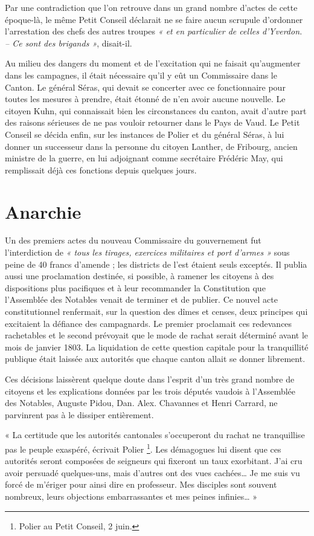 \documentclass[french,twoside]{book} %
\newenvironment{quoteblock}%
  {\begin{quoting}}
  {\end{quoting}}
\newenvironment{quotebar}{%
    \def\FrameCommand{{\color{rubric!10!}\vrule width 0.5em} \hspace{0.9em}}%
    \def\OuterFrameSep{\itemsep} %
    \MakeFramed {\advance\hsize-\width \FrameRestore}
  }%
  {%
    \endMakeFramed
  }
\renewenvironment{quoteblock}%
  {%
    \savenotes
    \setstretch{0.9}
    \begin{quotebar}
  }
  {%
    \end{quotebar}
    \spewnotes
  }
\begin{document}
\noindent Par une contradiction que l’on retrouve dans un grand nombre d’actes de cette époque-là, le même Petit Conseil déclarait ne se faire aucun scrupule d’ordonner l’arrestation des chefs des autres troupes \emph{« et en particulier de celles d’Yverdon. – Ce sont des brigands »}, disait-il.\par
Au milieu des dangers du moment et de l’excitation qui ne faisait qu’augmenter dans les campagnes, il était nécessaire qu’il y eût un Commissaire dans le Canton. Le général Séras, qui devait se concerter avec ce fonctionnaire pour toutes les mesures à prendre, était étonné de n’en avoir aucune nouvelle. Le citoyen Kuhn, qui connaissait bien les circonstances du canton, avait d’autre part des raisons sérieuses de ne pas vouloir retourner dans le Pays de Vaud. Le Petit Conseil se décida enfin, sur les instances de Polier et du général Séras, à lui donner un successeur dans la personne du citoyen Lanther, de Fribourg, ancien ministre de la guerre, en lui adjoignant comme secrétaire Frédéric May, qui remplissait déjà ces fonctions depuis quelques jours.
\section[Anarchie]{Anarchie}
\noindent Un des premiers actes du nouveau Commissaire du gouvernement fut l’interdiction de \emph{« tous les tirages, exercices militaires et port d’armes »} sous peine de 40 francs d’amende ; les districts de l’est étaient seuls exceptés. Il publia aussi une proclamation destinée, si possible, à ramener les citoyens à des dispositions plus pacifiques et à leur recommander la Constitution que l’Assemblée des Notables venait de terminer et de publier. Ce nouvel acte constitutionnel renfermait, sur la question des dîmes et censes, deux principes qui excitaient la défiance des campagnards. Le premier proclamait ces redevances rachetables et le second prévoyait que le mode de rachat serait déterminé avant le mois de janvier 1803. La liquidation de cette question capitale pour la tranquillité publique était laissée aux autorités que chaque canton allait se donner librement.\par
Ces décisions laissèrent quelque doute dans l’esprit d’un très grand nombre de citoyens et les explications données par les trois députés vaudois à l’Assemblée des Notables, Auguste Pidou, Dan. Alex. Chavannes et Henri Carrard, ne parvinrent pas à le dissiper entièrement.\par

\begin{quoteblock}
 \noindent  « La certitude que les autorités cantonales s’occuperont du rachat ne tranquillise pas le peuple exaspéré, écrivait Polier \footnote{Polier au Petit Conseil, 2 juin.}. Les démagogues lui disent que ces autorités seront composées de seigneurs qui fixeront un taux exorbitant. J’ai cru avoir persuadé quelques-uns, mais d’autres ont des vues cachées… Je me suis vu forcé de m’ériger pour ainsi dire en professeur. Mes disciples sont souvent nombreux, leurs objections embarrassantes et mes peines infinies… »
 \end{quoteblock}
\end{document}

